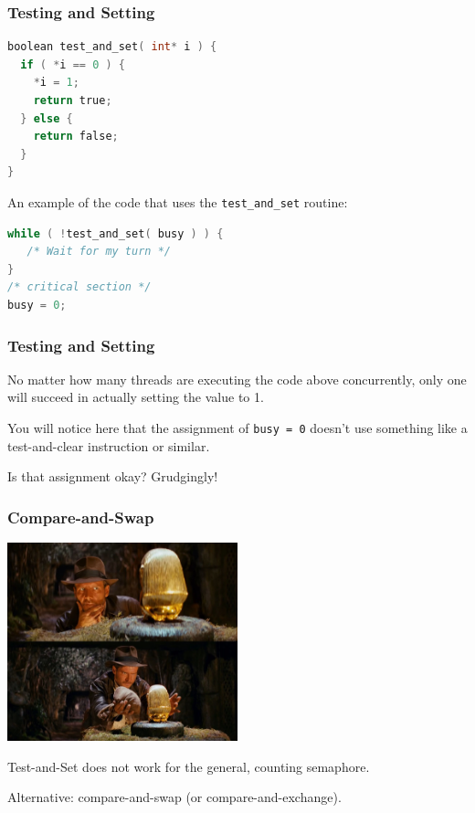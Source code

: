 \begin{frame}[fragile]
\frametitle{Testing and Setting}

\begin{lstlisting}[language=C]
boolean test_and_set( int* i ) {
  if ( *i == 0 ) {
    *i = 1;
    return true;
  } else {
    return false;
  }
}
\end{lstlisting}

An example of the code that uses the \texttt{test\_and\_set} routine:

\begin{lstlisting}[language=C]
while ( !test_and_set( busy ) ) {
   /* Wait for my turn */
}
/* critical section */
busy = 0;
\end{lstlisting}

\end{frame}

\begin{frame}
\frametitle{Testing and Setting}

No matter how many threads are executing the code above concurrently, only one will succeed in actually setting the value to 1.

You will notice here that the assignment of \texttt{busy = 0} doesn't use something like a test-and-clear instruction or similar.

Is that assignment okay? Grudgingly!

\end{frame}

\begin{frame}
\frametitle{Compare-and-Swap}

\begin{center}
	\includegraphics[width=0.5\textwidth]{images/compare-swap.png}
\end{center}

Test-and-Set does not work for the general, counting semaphore.

Alternative: \alert{compare-and-swap} (or compare-and-exchange).

\end{frame}

